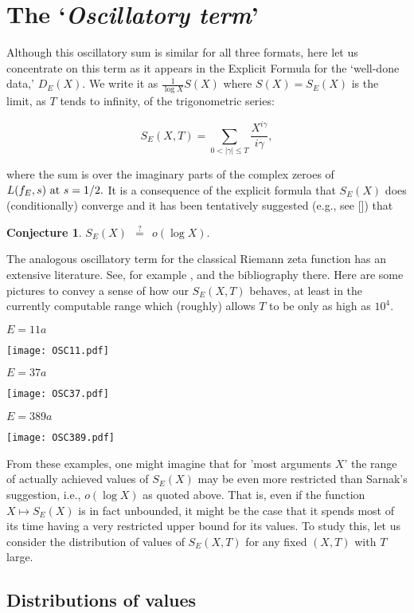 \documentclass[11pt]{article}
\theoremstyle{plain}
\newtheorem{conjecture}[theorem]{Conjecture}
\theoremstyle{definition}
\numberwithin{equation}{section}
\numberwithin{figure}{section}
\numberwithin{table}{section}
\begin{document}
 \section{The `{\it Oscillatory term}'}\label{osc}
  Although this oscillatory sum is similar for all three formats, here let us concentrate on this term as it appears in the Explicit Formula for the `well-done data,'  $D_E(X)$. We write it as  ${\frac{1}{\log X}}S(X)$ where $S(X)=S_E(X)$ is the limit, as $T$ tends to infinity, of the trigonometric series:

  $$S_E(X,T) = \sum_{0<|\gamma| \le T}{\frac{X^{i\gamma}}{i\gamma}},$$

  where the sum is over the imaginary parts of the complex zeroes of  $L(f_E, s)\ {\rm at}\ s=1/2.$   It is a consequence of the explicit formula that $S_E(X)$ does (conditionally) converge and it has been tentatively suggested  (e.g., see [{\cite{S}}]) that

  \begin{conjecture}  $ S_E(X)\ \  {\stackrel{?}{=}}\ \  o(\log X).$\end{conjecture}   The analogous oscillatory term for the classical Riemann zeta function  has an extensive literature. See, for example \cite{G}, \cite{Fu} and the bibliography there. Here are some pictures to convey a sense of how our $S_E(X,T)$ behaves, at least in the currently computable range which (roughly) allows $T$ to be only as high as  $10^4$.
  \newpage
  \centerline{ $E = 11a$}
 \vskip10pt
  \texttt{[image: OSC11.pdf]}

  \centerline{ $E = 37a$}
  \texttt{[image: OSC37.pdf]}
   \vskip20pt
  \centerline{ $E = 389a$}
\vskip20pt
  \texttt{[image: OSC389.pdf]}

 From these examples, one might imagine that for 'most arguments $X$' the range of actually achieved values of $S_E(X)$  may be even more restricted than Sarnak's suggestion, i.e., $o(\log X)$ as quoted above. That is, even if  the function $X \mapsto S_E(X)$ is in fact unbounded, it might be the case that it spends most of its time having a very restricted upper bound for its values.  To study this, let us consider the distribution of values of $S_E(X,T)$ for any fixed $(X,T)$ with $T$ large.


\subsection{Distributions of values }
\end{document}
